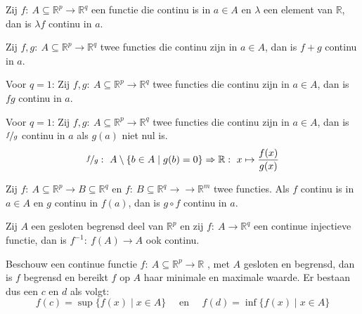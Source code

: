 \documentclass[main.tex]{subfiles}
\begin{document}
\begin{pr}
  Zij $f:\ A \subseteq \mathbb{R}^{p} \rightarrow \mathbb{R}^{q}$ een functie die continu is in $a\in A$ en $\lambda$ een element van $\mathbb{R}$, dan is $\lambda f$ continu in $a$.
\end{pr}

\begin{pr}
  Zij $f,g:\ A \subseteq \mathbb{R}^{p} \rightarrow \mathbb{R}^{q}$ twee functies die continu zijn in $a\in A$, dan is $f+g$ continu in $a$.
\end{pr}

\begin{pr}
  Voor $q=1$:
  Zij $f,g:\ A \subseteq \mathbb{R}^{p} \rightarrow \mathbb{R}^{q}$ twee functies die continu zijn in $a \in A$, dan is $fg$ continu in $a$.
\end{pr}

\begin{pr}
  Voor $q=1$:
  Zij $f,g:\ A \subseteq \mathbb{R}^{p} \rightarrow \mathbb{R}^{q}$ twee functies die continu zijn in $a \in A$, dan is $\nicefrac{f}{g}$ continu in $a$ als $g(a)$ niet nul is.
  \[ \nicefrac{f}{g}:\ A \setminus \{b \in A \mid g(b) = 0 \} \Rightarrow \mathbb{R}:\ x \mapsto \frac{f(x)}{g(x)} \]
\end{pr}

\begin{pr}
  Zij $f:\ A \subseteq \mathbb{R}^{p} \rightarrow B \subseteq \mathbb{R}^{q}$ en $f:\ B \subseteq \mathbb{R}^{q} \rightarrow \rightarrow \mathbb{R}^{m}$ twee functies.
  Als $f$ continu is in $a\in A$ en $g$ continu in $f(a)$, dan is $g\circ f$ continu in $a$.
\end{pr}

\begin{pr}
  Zij $A$ een gesloten begrensd deel van $\mathbb{R}^{p}$ en zij $f:\ A \rightarrow \mathbb{R}^{q}$ een continue injectieve functie, dan is $f^{-1}:\ f(A) \rightarrow A$ ook continu.
\end{pr}

\begin{st}
  Beschouw een continue functie $f:\ A \subseteq \mathbb{R}^{p} \rightarrow \mathbb{R}$ , met $A$ gesloten en begrensd, dan is $f$ begrensd en bereikt $f$ op $A$ haar minimale en maximale waarde.
  Er bestaan dus een $c$ en $d$ als volgt:
  \[ f(c) = \sup\{ f(x) \mid x\in A\} \quad \text{ en } \quad f(d) = \inf\{f(x) \mid x\in A\} \]
\end{st}
\end{document}
